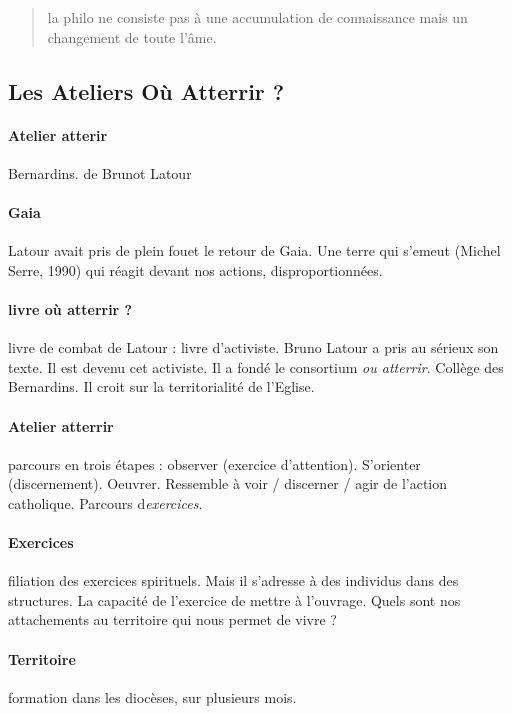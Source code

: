  \begin{quote}
    la philo ne consiste pas à une accumulation de connaissance mais un changement de toute l'âme.  
 \end{quote}
\subsection{Les Ateliers Où Atterrir ?}

 \paragraph{Atelier atterir} Bernardins. de Brunot Latour

 \paragraph{Gaia} Latour avait pris de plein fouet le retour de Gaia. Une terre qui s'emeut (Michel Serre, 1990) qui réagit devant nos actions, disproportionnées.

 \paragraph{livre où atterrir ?} livre de combat de Latour : livre d'activiste. Bruno Latour a pris au sérieux son texte. Il est devenu cet activiste. Il a fondé le consortium \textit{ou atterrir}. Collège des Bernardins. 
 Il croit sur la territorialité de l'Eglise. 

 \paragraph{Atelier atterrir} parcours en trois étapes : observer (exercice d'attention). S'orienter (discernement). Oeuvrer. 
 Ressemble à voir / discerner / agir de l'action catholique. 
 Parcours d\textit{exercices}.
 \paragraph{Exercices } filiation des exercices spirituels. Mais il s'adresse à des individus dans des structures.
 La capacité de l'exercice de mettre à l'ouvrage. 
 Quels sont nos attachements au territoire qui nous permet de vivre ? 

 \paragraph{Territoire} formation dans les diocèses, sur plusieurs mois.



